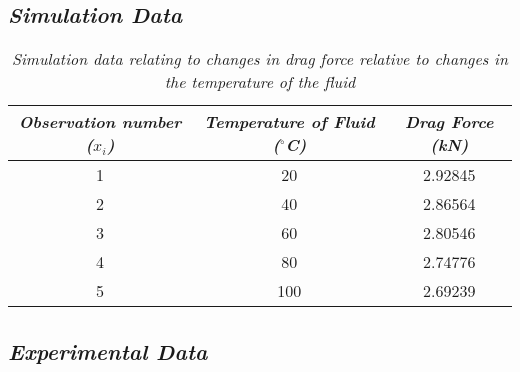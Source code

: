 

\subsection{\textit{Simulation Data}}

	\begin{table}[H]
		\centering
		\begin{tabular}{|c|c|c|}
			\hline
			\hline
			\textit{Observation number ($x_i$)} & \textit{Temperature of Fluid ($^\circ$C)} & \textit{Drag Force (kN)} \\
			\hline
			\hline
			1 & 20 & 2.92845 \\
			\hline
			2 & 40 & 2.86564 \\
			\hline
			3 & 60 & 2.80546 \\
			\hline
			4 & 80 & 2.74776 \\
			\hline
			5 & 100 & 2.69239 \\
			\hline
			\hline
		\end{tabular}
		\caption{\textit{Simulation data relating to changes in drag force relative to changes in the temperature of the fluid}}
		\label{simdat}
	\end{table}

\subsection{\textit{Experimental Data}}

